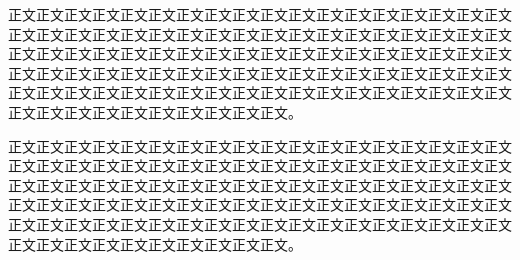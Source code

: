 正文正文正文正文正文正文正文正文正文正文正文正文正文正文正文正文正文正文正文正文正文正文正文正文正文正文正文正文正文正文正文正文正文正文正文正文正文正文正文正文正文正文正文正文正文正文正文正文正文正文正文正文正文正文正文正文正文正文正文正文正文正文正文正文正文正文正文正文正文正文正文正文正文正文正文正文正文正文正文正文正文正文正文正文正文正文正文正文正文正文正文正文正文正文正文正文正文正文正文正文。

正文正文正文正文正文正文正文正文正文正文正文正文正文正文正文正文正文正文正文正文正文正文正文正文正文正文正文正文正文正文正文正文正文正文正文正文正文正文正文正文正文正文正文正文正文正文正文正文正文正文正文正文正文正文正文正文正文正文正文正文正文正文正文正文正文正文正文正文正文正文正文正文正文正文正文正文正文正文正文正文正文正文正文正文正文正文正文正文正文正文正文正文正文正文正文正文正文正文正文正文。

